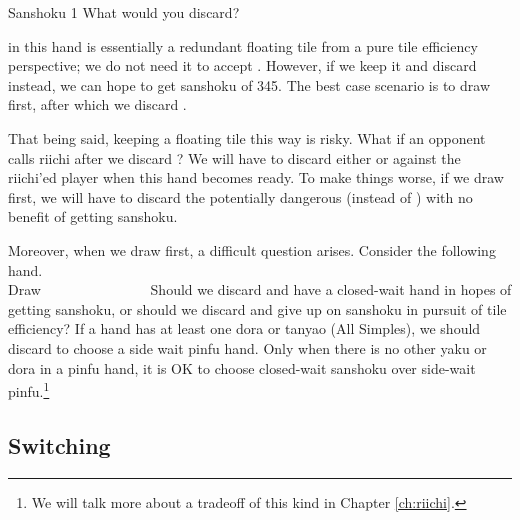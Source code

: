 \begin{itembox}[r]{{\jap Sanshoku} 1}
\bp
{}\bei
\ep
\vspace{-10pt} What would you discard? \vspace{-5pt}
\end{itembox}
\noindent
{\LARGE{}} in this hand is essentially a redundant floating tile from a pure tile efficiency perspective; we do not need it to accept {\LARGE{}}. However, if we keep it and discard {\LARGE\bei} instead, we can hope to get {\jap sanshoku} of 345. The best case scenario is to draw {\LARGE{}} first, after which we discard {\LARGE{}}. 

\bigskip
That being said, keeping a floating tile this way is risky. What if an opponent calls riichi after we discard {\LARGE\bei}? We will have to discard either {\LARGE{}} or {\LARGE{}} against the riichi'ed player when this hand becomes ready. To make things worse, if we draw {\LARGE{}} first, we will have to discard the potentially dangerous {\LARGE{}} (instead of {\LARGE\bei}) with no benefit of getting {\jap sanshoku}. 

\bigskip
Moreover, when we draw {\LARGE{}} first, a difficult question arises. Consider the following hand. 
\bp
{}~\\
\hfill\footnotesize{Draw~~~~~~~~~~~~~~~}
\ep
Should we discard {\LARGE{}} and have a closed-wait hand in hopes of getting {\jap sanshoku}, or should we discard {\LARGE{}} and give up on {\jap sanshoku} in pursuit of tile efficiency?
If a hand has at least one {\jap dora} or {\jap tanyao} (All Simples), we should discard {\LARGE{}} to choose a side wait {\jap pinfu} hand. Only when there is no other {\jap yaku} or {\jap dora} in a {\jap pinfu} hand, it is OK to choose closed-wait {\jap sanshoku} over side-wait {\jap pinfu}.\footnote{We will talk more about a tradeoff of this kind in Chapter \ref{ch:riichi}.}



\newpage
\subsection{Switching} \label{sec:san2}

